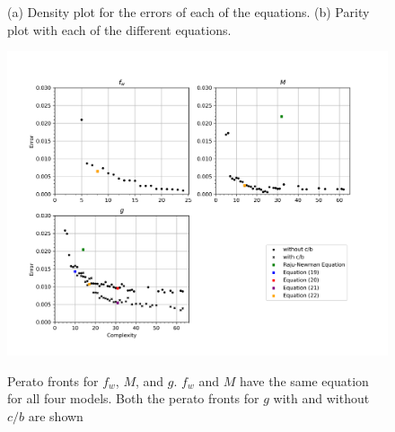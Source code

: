 \begin{figure}%
    \centering
    \qquad
    \caption{(a) Density plot for the errors of each of the equations. (b) Parity plot with each of the different equations.}%
    \label{fig:error_plots}%
\end{figure}


\begin{figure}
    \centering
    \includegraphics[width=6in]{Figures/perato_front.png}
    \label{fig:perato_front}
    \caption{Perato fronts for $f_w$, $M$, and $g$. $f_w$ and $M$ have the same equation for all four models. Both the perato fronts for $g$ with and without $c/b$ are shown} 
\end{figure}

